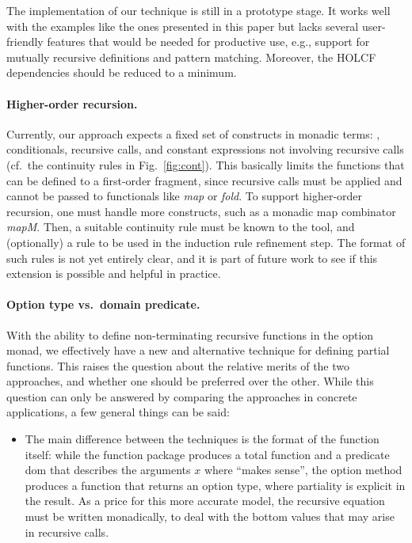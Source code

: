 \documentclass[copyright,creativecommons,sharealike]{eptcs}
\theoremstyle{remark}
\begin{document}
\begin{isabellebody}
\begin{isamarkuptext}
The implementation of our technique is still in a prototype stage.  It
works well with the examples like the ones presented in this paper
but lacks several user-friendly features that would be needed for
productive use, e.g., support for mutually recursive
definitions and pattern matching. Moreover, the HOLCF dependencies
should be reduced to a minimum.

\paragraph{Higher-order recursion.}

Currently, our approach expects a fixed set of constructs in
monadic terms: \isa{{\isasymguillemotright}{\isacharequal}}, conditionals, recursive calls, and
  constant expressions not involving recursive calls (cf.\ the
continuity rules in Fig.~\ref{fig:cont}).
This basically limits the functions that can be defined to a
first-order fragment, since recursive calls must be applied and cannot
  be passed to functionals like \emph{map} or
\emph{fold}. To support higher-order recursion, one must handle more constructs, such as
a monadic map combinator \emph{mapM}.  Then, a suitable continuity
rule must be known to the tool, and (optionally) a rule to be used in
the induction rule refinement step.  The format of such rules is not
yet entirely clear, and it is part of future work to see if this
extension is possible and helpful in practice.


\paragraph{Option type vs.\ domain predicate.}

With the ability to define non-terminating recursive functions in the
option monad, we effectively have a new and alternative technique for
defining partial functions.  This raises the question about the
relative merits of the two approaches, and whether one should be
preferred over the other.
While this question can only be answered by comparing the approaches
  in concrete applications, a
few general things can be said:
\begin{itemize}
\item 
The main difference between the techniques is the format of
the function itself: while the function package produces a total
function and a predicate dom that describes
the arguments $x$ where  ``makes sense'', the option method
produces a function that returns an option type, where partiality is 
explicit in the result. As a price for this more accurate model, the
recursive equation must be written monadically, to deal with the
bottom values that may arise in recursive calls.


\end{itemize}
\end{isamarkuptext}
\end{isabellebody}
\end{document}
